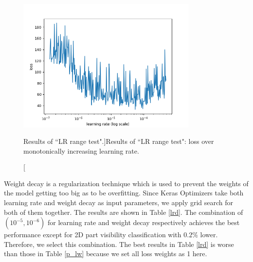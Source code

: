 \documentclass[a4paper,12pt]{article}
\begin{document}
\begin{figure}[H]		
	\includegraphics[width=0.8\textwidth]{LR_range_test.png}
	\caption[Results of ``LR range test".]{Results of ``LR range test": loss over monotonically increasing learning rate. }
	\centering
	\label{figure:lr_test}
\end{figure}

Weight decay is a regularization technique which is used to prevent the weights of the model getting too big as to be overfitting. Since Keras Optimizers \cite{chollet2015keras} take both learning rate and weight decay as input parameters, we apply grid search for both of them together. The results are shown in Table \ref{lrd}. The combination of $(10^{-5}, 10^{-6})$ for learning rate and weight decay respectively achieves the best performance except for 2D part visibility classification with $0.2\%$ lower. Therefore, we select this combination. The best results in Table \ref{lrd} is worse than those in Table \ref{p_lw} because we set all loss weights as 1 here. 
\end{document}
